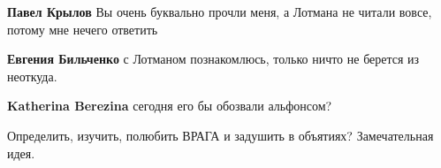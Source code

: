 \begin{itemize}
\begin{itemize}
 
\textbf{Павел Крылов} Вы очень буквально прочли меня, а Лотмана не читали вовсе, потому мне нечего ответить

 
\textbf{Евгения Бильченко}
с Лотманом познакомлюсь, только ничто не берется из неоткуда.

 
\textbf{Katherina Berezina}
сегодня его бы обозвали альфонсом?
\end{itemize}

 
Определить, изучить, полюбить ВРАГА и задушить в объятиях? Замечательная идея.

\end{itemize}

